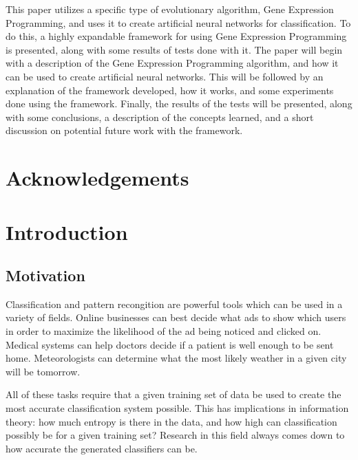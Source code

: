 \documentclass[a4paper,11pt]{report}
\begin{document}
This paper utilizes a specific type of evolutionary algorithm, Gene Expression Programming,
and uses it to create artificial neural networks for classification. To do this, a highly expandable 
framework for using Gene Expression Programming is presented, along with some results of tests done 
with it. The paper will begin with a description of the Gene Expression Programming algorithm, and 
how it can be used to create artificial neural networks. This will be followed by an explanation 
of the framework developed, how it works, and some experiments done using the framework. Finally,
the results of the tests will be presented, along with some conclusions, a description of the 
concepts learned, and a short discussion on potential future work with the framework. 


\chapter*{Acknowledgements}



\tableofcontents 

\listoffigures

\listoftables

\chapter{Introduction}

\section{Motivation}

Classification and pattern recongition are powerful tools which can be used in a variety of 
fields. Online businesses can best decide what ads to show which users in order to maximize
the likelihood of the ad being noticed and clicked on. Medical systems can help doctors 
decide if a patient is well enough to be sent home. Meteorologists can determine what the 
most likely weather in a given city will be tomorrow. 

All of these tasks require that a given 
training set of data be used to create the most accurate classification system possible. 
This has implications in information theory: how much entropy is there in the data, and 
how high can classification possibly be for a given training set? Research in this field 
always comes down to how accurate the generated classifiers can be. 
\end{document}
